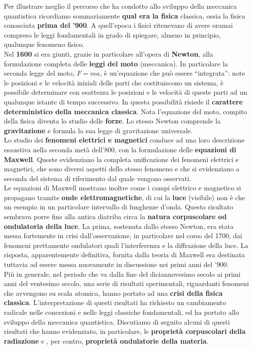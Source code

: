 \documentclass[a4paper,12pt,oneside]{book}
\begin{document}
Per illustrare meglio il percorso che ha condotto allo sviluppo della meccanica quantistica ricordiamo sommariamente \textbf{qual era la fisica} classica, ossia la fisica conosciuta \textbf{prima del '900}.  A quell'epoca i fisici ritenevano di avere oramai compreso le leggi fondamentali in grado di spiegare, almeno in principio, qualunque fenomeno fisico.\\

Nel \textbf{1600} si era giunti, grazie in particolare all'opera di \textbf{Newton}, alla formulazione completa delle \textbf{leggi del moto} (meccanica). In particolare la seconda legge del moto, $F=ma$, è un'equazione che può essere ``integrata'': note le posizioni e le velocità iniziali delle parti che costituiscono un sistema, è possibile determinare con esattezza le posizioni e le velocità di queste parti ad un qualunque istante di tempo successivo. In questa possibilità risiede il \textbf{carattere deterministico della meccanica classica}. Nota l'equazione del moto, compito della fisica diventa lo studio delle \textbf{forze}. Lo stesso Newton comprende la \textbf{gravitazione} e formula la sua legge di gravitazione universale.\\

Lo studio dei \textbf{fenomeni elettrici e magnetici} conduce ad una loro descrizione esaustiva nella seconda metà dell'800, con la formulazione delle \textbf{equazioni di Maxwell}. Queste evidenziano la completa unificazione dei fenomeni elettrici e magnetici, che sono diversi aspetti dello stesso fenomeno e che si evidenziano a seconda del sistema di riferimento dal quale vengono osservati.\\

Le equazioni di Maxwell mostrano inoltre come i campi elettrico e magnetico si propagano tramite \textbf{onde elettromagnetiche}, di cui la \textbf{luce} (visibile) non è che un esempio in un particolare intervallo di lunghezze d'onda. Questo risultato sembrava porre fine alla antica diatriba circa la \textbf{natura corpuscolare od ondulatoria della luce}. La prima, sostenuta dallo stesso Newton, era stata messa fortemente in crisi dall'osservazione, in particolare nel corso del 1700, dai fenomeni prettamente ondulatori quali l'interferenza e la diffrazione della luce. La risposta, apparentemente definitiva, fornita dalla teoria di Maxwell era destinata tuttavia ad essere messa nuovamente in discussione nei primi anni del '900.\\

Più in generale, nel periodo che va dalla fine del diciannovesimo secolo ai primi anni del ventesimo secolo, una serie di risultati sperimentali, riguardanti fenomeni che avvengono su scala atomica, hanno portato ad una \textbf{crisi della fisica classica}. L'interpretazione di questi risultati ha richiesto un cambiamento radicale nelle concezioni e nelle leggi classiche fondamentali, ed ha portato allo sviluppo della meccanica quantistica. Discutiamo di seguito alcuni di questi risultati che hanno evidenziato, in particolare, le \textbf{proprietà corpuscolari della radiazione} e , per contro, \textbf{proprietà ondulatorie della materia}.
\end{document}
